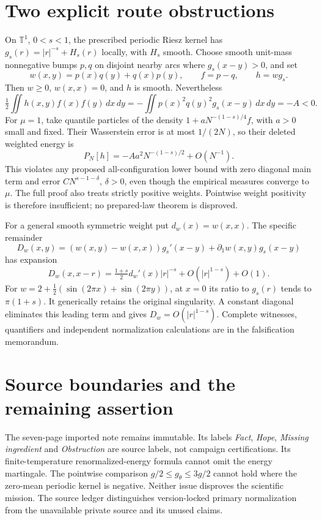\documentclass[11pt]{article}
\newcommand{\T}{\mathbb T}
\begin{document}
\section{Two explicit route obstructions}
On $\T^1$, $0<s<1$, the prescribed periodic Riesz kernel has
$g_s(r)=|r|^{-s}+H_s(r)$ locally, with $H_s$ smooth. Choose smooth
unit-mass nonnegative bumps $p,q$ on disjoint nearby arcs where
$g_s(x-y)>0$, and set
\[
 w(x,y)=p(x)q(y)+q(x)p(y),\qquad f=p-q,\qquad h=wg_s.
\]
Then $w\ge0$, $w(x,x)=0$, and $h$ is smooth. Nevertheless
\[
 \tfrac12\iint h(x,y)f(x)f(y)\,dx\,dy
 =-\iint p(x)^2q(y)^2g_s(x-y)\,dx\,dy=-A<0.
\]
For $\mu=1$, take quantile particles of the density
$1+aN^{-(1-s)/4}f$, with $a>0$ small and fixed. Their Wasserstein
error is at most $1/(2N)$, so their deleted weighted energy is
\[
 P_N[h]=-Aa^2N^{-(1-s)/2}+O(N^{-1}).
\]
This violates any proposed all-configuration lower bound with zero
diagonal main term and error $CN^{s-1-\delta}$, $\delta>0$,
even though the empirical measures converge to $\mu$.
The full proof also treats strictly positive weights. Pointwise weight
positivity is therefore insufficient; no prepared-law theorem is disproved.

For a general smooth symmetric weight put $d_w(x)=w(x,x)$. The
specific remainder
\[
 D_w(x,y)=(w(x,y)-w(x,x))g_s'(x-y)+\partial_1w(x,y)g_s(x-y)
\]
has expansion
\[
 D_w(x,x-r)=\tfrac{1+s}{2}d_w'(x)|r|^{-s}
               +O(|r|^{1-s})+O(1).
\]
For $w=2+\tfrac12(\sin(2\pi x)+\sin(2\pi y))$, at $x=0$ its ratio
to $g_s(r)$ tends to $\pi(1+s)$. It generically retains the original
singularity. A constant diagonal eliminates this leading term and gives
$D_w=O(|r|^{1-s})$. Complete witnesses, quantifiers and independent
normalization calculations are in the falsification memorandum.

\section{Source boundaries and the remaining assertion}
The seven-page imported note remains immutable. Its labels
\emph{Fact}, \emph{Hope}, \emph{Missing ingredient} and
\emph{Obstruction} are source labels, not campaign certifications.
Its finite-temperature renormalized-energy formula cannot omit the
energy martingale. The pointwise comparison
$g/2\le g_\theta\le3g/2$ cannot hold where the zero-mean periodic
kernel is negative. Neither issue disproves the scientific mission.
The source ledger distinguishes version-locked primary normalization
from the unavailable private source and its unused claims.
\end{document}
